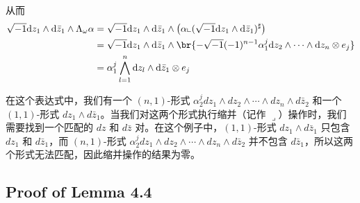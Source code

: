     从而
    \begin{align*}
      \xu \dd z_1\wedge\dd \bar{z}_1\wedge \Lambda_\omega \alpha 
&=\xu \dd z_1\wedge\dd \bar{z}_1\wedge \left(\alpha\llcorner (\xu \dd z_1\wedge\dd \bar{z}_1)^\sharp\right)\\ 
&=\xu \dd z_1\wedge \dd \bar{z}_1\wedge \br{-\xu (-1)^{n-1}\alpha_1^j \dd z_2\wedge \cdots\wedge\dd z_n \otimes e_j}\\ 
&=\alpha_1^j\bigwedge_{l=1}^n \dd z_l \wedge\dd \bar{z}_1\otimes e_j
    \end{align*}
\begin{remark}
      在这个表达式中，我们有一个 \((n,1)\)-形式 \(\alpha_2^j dz_1 \wedge dz_2 \wedge \cdots \wedge dz_n \wedge d\bar{z}_2\) 和一个 \((1,1)\)-形式 \(dz_1 \wedge d\bar{z}_1\)。当我们对这两个形式执行缩并（记作 \(\lrcorner\)）操作时，我们需要找到一个匹配的 \(dz\) 和 \(d\bar{z}\) 对。在这个例子中，\((1,1)\)-形式 \(dz_1 \wedge d\bar{z}_1\) 只包含 \(dz_1\) 和 \(d\bar{z}_1\)，而 \((n,1)\)-形式 \(\alpha_2^j dz_1 \wedge dz_2 \wedge \cdots \wedge dz_n \wedge d\bar{z}_2\) 并不包含 \(d\bar{z}_1\)，所以这两个形式无法匹配，因此缩并操作的结果为零。
\end{remark}

\subsection{Proof of Lemma 4.4}

